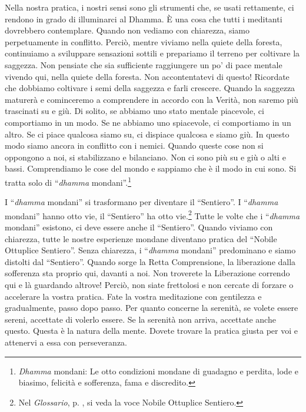 Nella nostra pratica, i nostri sensi sono gli strumenti che, se usati
rettamente, ci rendono in grado di illuminarci al Dhamma. È una cosa che
tutti i meditanti dovrebbero contemplare. Quando non vediamo con
chiarezza, siamo perpetuamente in conflitto. Perciò, mentre viviamo
nella quiete della foresta, continuiamo a sviluppare sensazioni sottili
e prepariamo il terreno per coltivare la saggezza. Non pensiate che sia
sufficiente raggiungere un po' di pace mentale vivendo qui, nella quiete
della foresta. Non accontentatevi di questo! Ricordate che dobbiamo
coltivare i semi della saggezza e farli crescere. Quando la saggezza
maturerà e cominceremo a comprendere in accordo con la Verità, non
saremo più trascinati su e giù. Di solito, se abbiamo uno stato mentale
piacevole, ci comportiamo in un modo. Se ne abbiamo uno spiacevole, ci
comportiamo in un altro. Se ci piace qualcosa siamo su, ci dispiace
qualcosa e siamo giù. In questo modo siamo ancora in conflitto con i
nemici. Quando queste cose non si oppongono a noi, si stabilizzano e
bilanciano. Non ci sono più su e giù o alti e bassi. Comprendiamo le
cose del mondo e sappiamo che è il modo in cui sono. Si tratta solo di
``\emph{dhamma} mondani''.\footnote{\emph{Dhamma} mondani: Le otto
  condizioni mondane di guadagno e perdita, lode e biasimo, felicità e
  sofferenza, fama e discredito.}

I ``\emph{dhamma} mondani'' si trasformano per diventare il
``Sentiero''. I ``\emph{dhamma} mondani'' hanno otto vie, il
``Sentiero'' ha otto vie.\footnote{Nel \emph{Glossario}, p. \pageref{glossary-ottuplice}, si veda la voce
  Nobile Ottuplice Sentiero.} Tutte le volte che i ``\emph{dhamma}
mondani'' esistono, ci deve essere anche il ``Sentiero''. Quando viviamo
con chiarezza, tutte le nostre esperienze mondane diventano pratica del
``Nobile Ottuplice Sentiero''. Senza chiarezza, i ``\emph{dhamma}
mondani'' predominano e siamo distolti dal ``Sentiero''. Quando sorge la
Retta Comprensione, la liberazione dalla sofferenza sta proprio qui,
davanti a noi. Non troverete la Liberazione correndo qui e là guardando
altrove! Perciò, non siate frettolosi e non cercate di forzare o
accelerare la vostra pratica. Fate la vostra meditazione con gentilezza
e gradualmente, passo dopo passo. Per quanto concerne la serenità, se
volete essere sereni, accettate di volerlo essere. Se la serenità non
arriva, accettate anche questo. Questa è la natura della mente. Dovete
trovare la pratica giusta per voi e attenervi a essa con perseveranza.

